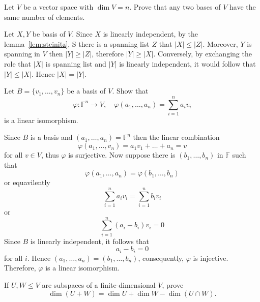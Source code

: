 \documentclass[11pt]{article}
\begin{document}
\begin{problem}
Let $V$ be a vector space with $\dim V=n$. Prove that any two bases of $V$ have the same number of elements.
\end{problem}
\begin{sol}
    Let $X,Y$ be basis of $V$. Since $X$ is linearly independent, by the lemma~\ref{lem:steinitz}, S there is a spanning list $Z$ that $|X| \leq |Z|$. Moreover, $Y$ is spanning in $V$ then $|Y| \geq |Z|$, therefore $|Y| \geq |X|$. Conversely, by exchanging the role that $|X|$ is spanning list and $|Y|$ is linearly independent, it would follow that $|Y| \leq |X|$. Hence $|X| = |Y|$.
\end{sol}
\begin{problem}
Let $B=\{v_1,\dots,v_n\}$ be a basis of $V$. Show that 
\[
\varphi:\mathbb{F}^n\to V,\quad \varphi(a_1,\dots,a_n)=\sum_{i=1}^n a_i v_i
\]
is a linear isomorphism.
\end{problem}
\begin{sol}
    Since $B$ is a basis and $(a_1,\dots,a_n) = \mathbb{F}^n$ then the linear combination
    \[
        \varphi(a_1,\dots,v_n) = a_1v_1 + \dots + a_n = v
    \]
    for all $v \in V$, thus $\varphi$ is surjective. Now suppose there is $(b_1,\dots,b_n)$ in $\mathbb{F}$ such that 
    \[
        \varphi(a_1,\dots,a_n) = \varphi(b_1,\dots,b_n)
    \]
    or equavilently
    \[
        \sum_{i = 1}^n a_iv_i = \sum_{i = 1}^n b_iv_i
    \]
    or 
    \[
        \sum_{i = 1}^n (a_i - b_i)v_i = 0
    \]
    Since $B$ is linearly independent, it follows that 
    \[
        a_i - b_i = 0
    \]
    for all $i$. Hence $(a_1, \dots , a_n) = (b_1, \dots, b_n )$, consequently, $\varphi$ is injective. Therefore, $\varphi$ is a linear isomorphism.
\end{sol}
\begin{problem}
If $U,W\le V$ are subspaces of a finite-dimensional $V$, prove
\[
\dim(U+W)=\dim U+\dim W-\dim(U\cap W).
\]
\end{problem}
\end{document}
